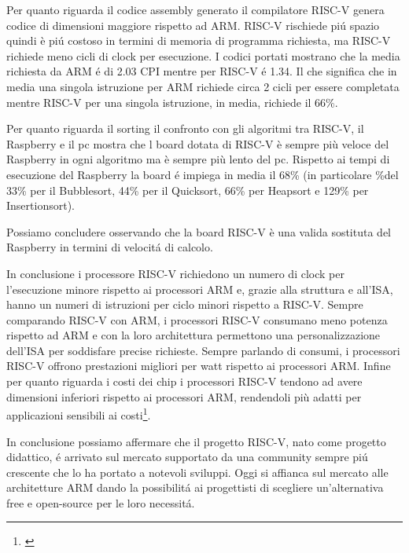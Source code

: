 \documentclass[12pt, a4paper]{report}
\begin{document}


Per quanto riguarda il codice assembly generato il compilatore RISC-V genera codice di dimensioni maggiore rispetto ad ARM. RISC-V rischiede pi\'u spazio quindi è pi\'u costoso in termini di memoria di programma richiesta, ma RISC-V richiede meno cicli di clock per esecuzione. I codici portati mostrano che la media richiesta da ARM \'e di 2.03 CPI mentre per RISC-V \'e 1.34. Il che significa che in media una singola istruzione per ARM richiede circa 2 cicli per essere completata mentre RISC-V per una singola istruzione, in media, richiede il 66\%.


Per quanto riguarda il sorting il confronto con gli algoritmi tra RISC-V, il Raspberry e il pc mostra che l board dotata di RISC-V è sempre più veloce del Raspberry in ogni algoritmo ma è sempre più lento del pc. Rispetto ai tempi di esecuzione del Raspberry la board \'e impiega in media il 68\% (in particolare \%del 33\% per il Bubblesort, 44\% per il Quicksort, 66\% per Heapsort e 129\% per Insertionsort). 

Possiamo concludere osservando che la board RISC-V è una valida sostituta del Raspberry in termini di velocit\'a di calcolo.%


In conclusione i processore RISC-V richiedono un numero di clock per l'esecuzione minore rispetto ai processori ARM e, grazie alla struttura e all'ISA, hanno un numeri di istruzioni per ciclo minori rispetto a RISC-V. 
Sempre comparando RISC-V con ARM, i processori RISC-V consumano meno potenza rispetto ad ARM e con la loro architettura permettono una personalizzazione dell'ISA per soddisfare precise richieste.  Sempre parlando di consumi, i processori RISC-V offrono prestazioni migliori per watt rispetto ai processori ARM. Infine per quanto riguarda i costi dei chip i processori RISC-V tendono ad avere dimensioni inferiori rispetto ai processori ARM, rendendoli più adatti per applicazioni sensibili ai costi\footnote{\cite{blogArmRISC-V}}.

In conclusione possiamo affermare che il progetto RISC-V, nato come progetto didattico, \'e arrivato sul mercato supportato da una community sempre pi\'u crescente che lo ha portato a notevoli sviluppi. Oggi si affianca sul mercato alle architetture ARM dando la possibilit\'a ai progettisti di scegliere un'alternativa free e open-source per le loro necessit\'a. 
\end{document}
